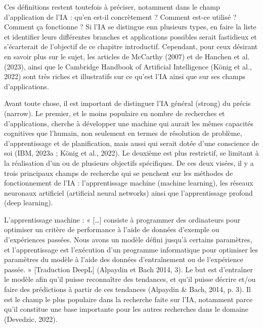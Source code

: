 \documentclass[
  letterpaper,
  DIV=11,
  numbers=noendperiod]{scrreprt}
\begin{document}
Ces définitions restent toutefois à préciser, notamment dans le champ
d'application de l'IA : qu'en est-il concrètement ? Comment est-ce
utilisé ? Comment ça fonctionne ? Si l'IA se distingue enn plusieurs
types, en faire la liste et identifier leurs différentes branches et
applications possibles serait fastidieux et s'écarterait de l'objectif
de ce chapitre introductif. Cependant, pour ceux désirant en savoir plus
sur le sujet, les articles de McCarthy (2007) et de Hanchen et al.
(2023), ainsi que le Cambridge Handbook of Artificial Intelligence
(König et al., 2022) sont très riches et illustratifs sur ce qu'est l'IA
ainsi que sur ses champs d'applications.

Avant toute chose, il est important de distinguer l'IA général (strong)
du précis (narrow). Le premier, et le moins populaire en nombre de
recherches et d'applications, cherche à développer une machine qui
aurait les mêmes capacités cognitives que l'humain, non seulement en
termes de résolution de problème, d'apprentissage et de planification,
mais aussi qui serait dotée d'une conscience de soi (IBM, 2023a ; König
et al., 2022). Le deuxième est plus restrictif, se limitant à la
réalisation d'un ou de plusieurs objectifs spécifiques. De ces deux
visées, il y a trois principaux champs de recherche qui se penchent sur
les méthodes de fonctionnement de l'IA : l'apprentissage machine
(machine learning), les réseaux neuronaux artificiel (artificial neural
networks) ainsi que l'apprentissage profond (deep learning).

L'apprentissage machine : « {[}\ldots{]} consiste à programmer des
ordinateurs pour optimiser un critère de performance à l'aide de données
d'exemple ou d'expériences passées. Nous avons un modèle défini jusqu'à
certains paramètres, et l'apprentissage est l'exécution d'un programme
informatique pour optimiser les paramètres du modèle à l'aide des
données d'entraînement ou de l'expérience passée. » {[}Traduction
DeepL{]} (Alpaydin et Bach 2014, 3). Le but est d'entraîner le modèle
afin qu'il puisse reconnaître des tendances, et qu'il puisse décrire
et/ou faire des prédictions à partir de ces tendances (Alpaydin \& Bach,
2014, p. 3). Il est le champ le plus populaire dans la recherche faite
sur l'IA, notamment parce qu'il constitue une base importante pour les
autres recherches dans le domaine (Devedzic, 2022).
\end{document}
